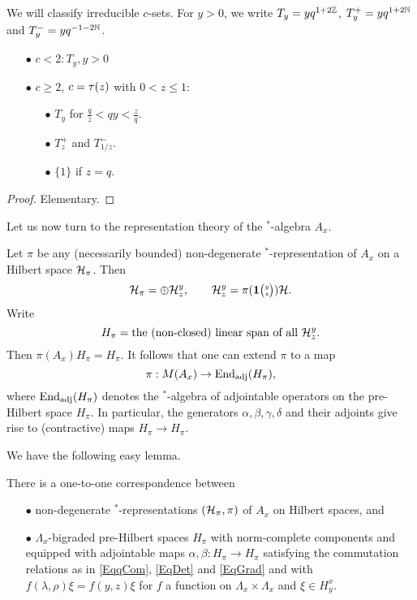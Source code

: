We will classify irreducible $c$-sets. For $y>0$, we write $T_y = yq^{1+2\mathbb{Z}}$, $T_y^+ = yq^{1+2\mathbb{N}}$ and $T_y^{-} = yq^{-1-2\mathbb{N}}$. 


\begin{Prop}\label{PropClass1D}

\begin{itemize} The following list exhausts all irreducible $c$-sets.
\item[$\bullet$] $c<2: T_y, y>0$
\item[$\bullet$] $c \geq 2$, $c=\operatorname{\tau}(z)$ with $0 < z\leq 1$:
\begin{itemize}
\item[$\bullet$] $T_y$ for $\frac{q}{z}<qy<\frac{z}{q}$.
\item[$\bullet$] $T_{z}^+$ and $T_{1/z}^-$.
\item[$\bullet$] $\{1\}$ if $z=q$.
\end{itemize}
\end{itemize}
\end{Prop} 
\begin{proof} Elementary.
\end{proof} 

Let us now turn to the representation theory of the $^*$-algebra $A_x$.

Let $\pi$ be any (necessarily bounded) non-degenerate $^*$-representation of $A_x$ on a Hilbert space $\mathcal{H}_{\pi}$. Then \[\mathcal{H}_{\pi} = \oplus \mathcal{H}^{y}_{z},\qquad \mathcal{H}^{y}_{z} = \pi(\mathbf{1}{\tiny {\begin{pmatrix} y\\z\end{pmatrix}}})\mathcal{H}.\] Write \[H_{\pi} =  \textrm{the (non-closed) linear span of all }\mathcal{H}^{y}_{z}.\] Then $\pi(A_x)H_{\pi} = H_{\pi}$. It follows that one can extend $\pi$ to a map \[\pi: M(A_x) \rightarrow \operatorname{\mathrm{End}}_{\operatorname{\mathrm{adj}}}(H_{\pi}),\] where $\operatorname{\mathrm{End}}_{\operatorname{\mathrm{adj}}}(H_{\pi})$ denotes the $^*$-algebra of adjointable operators on the pre-Hilbert space $H_{\pi}$. In particular, the generators $\alpha,\beta,\gamma,\delta$ and their adjoints give rise to (contractive) maps $H_{\pi}\rightarrow H_{\pi}$. 

We have the following easy lemma.

\begin{Lem} There is a one-to-one correspondence between\begin{itemize}\item[$\bullet$] non-degenerate $^*$-representations $(\mathcal{H}_{\pi},\pi)$ of $A_x$ on Hilbert spaces, and 
\item[$\bullet$] $\Lambda_x$-bigraded pre-Hilbert spaces $H_{\pi}$ with norm-complete components and equipped with adjointable maps $\alpha,\beta:H_{\pi}\rightarrow H_{\pi}$ satisfying the commutation relations as in \eqref{EqqCom}, \eqref{EqDet} and \eqref{EqGrad} and with $f(\lambda,\rho)\xi = f(y,z)\xi$ for $f$ a function on $\Lambda_x\times \Lambda_x$ and $\xi\in H^x_y$.
\end{itemize}
\end{Lem}

